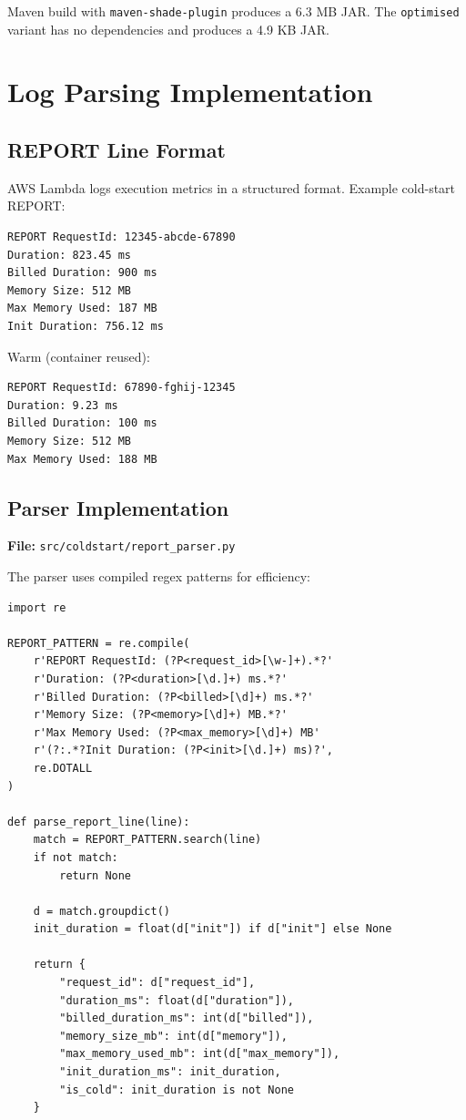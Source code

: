 Maven build with \texttt{maven-shade-plugin} produces a 6.3 MB JAR. The \texttt{optimised} variant has no dependencies and produces a 4.9 KB JAR.

\section{Log Parsing Implementation}

\subsection{REPORT Line Format}

AWS Lambda logs execution metrics in a structured format. Example cold-start REPORT:

\begin{verbatim}
REPORT RequestId: 12345-abcde-67890
Duration: 823.45 ms
Billed Duration: 900 ms
Memory Size: 512 MB
Max Memory Used: 187 MB
Init Duration: 756.12 ms
\end{verbatim}

Warm (container reused):

\begin{verbatim}
REPORT RequestId: 67890-fghij-12345
Duration: 9.23 ms
Billed Duration: 100 ms
Memory Size: 512 MB
Max Memory Used: 188 MB
\end{verbatim}

\subsection{Parser Implementation}

\textbf{File:} \texttt{src/coldstart/report\_parser.py}

The parser uses compiled regex patterns for efficiency:

\begin{verbatim}
import re

REPORT_PATTERN = re.compile(
    r'REPORT RequestId: (?P<request_id>[\w-]+).*?'
    r'Duration: (?P<duration>[\d.]+) ms.*?'
    r'Billed Duration: (?P<billed>[\d]+) ms.*?'
    r'Memory Size: (?P<memory>[\d]+) MB.*?'
    r'Max Memory Used: (?P<max_memory>[\d]+) MB'
    r'(?:.*?Init Duration: (?P<init>[\d.]+) ms)?',
    re.DOTALL
)

def parse_report_line(line):
    match = REPORT_PATTERN.search(line)
    if not match:
        return None
    
    d = match.groupdict()
    init_duration = float(d["init"]) if d["init"] else None
    
    return {
        "request_id": d["request_id"],
        "duration_ms": float(d["duration"]),
        "billed_duration_ms": int(d["billed"]),
        "memory_size_mb": int(d["memory"]),
        "max_memory_used_mb": int(d["max_memory"]),
        "init_duration_ms": init_duration,
        "is_cold": init_duration is not None
    }
\end{verbatim}


